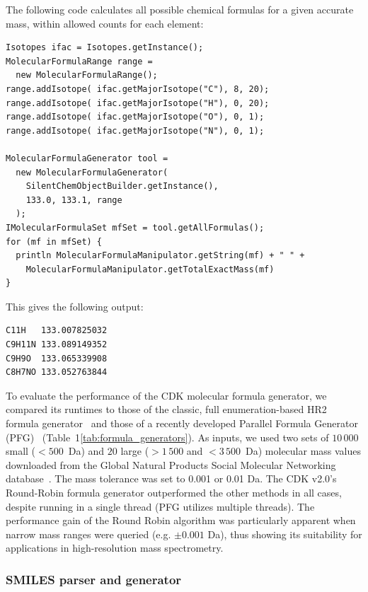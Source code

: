 \documentclass[10pt]{bmcart}
\def \cdkversion {v2.0}
\begin{document}
The following code calculates all possible chemical formulas for a given
accurate mass, within allowed counts for each element:

\vspace{0.2cm}
\begin{verbatim}
Isotopes ifac = Isotopes.getInstance();
MolecularFormulaRange range =
  new MolecularFormulaRange();
range.addIsotope( ifac.getMajorIsotope("C"), 8, 20);
range.addIsotope( ifac.getMajorIsotope("H"), 0, 20);
range.addIsotope( ifac.getMajorIsotope("O"), 0, 1);
range.addIsotope( ifac.getMajorIsotope("N"), 0, 1);

MolecularFormulaGenerator tool =
  new MolecularFormulaGenerator(
    SilentChemObjectBuilder.getInstance(),
    133.0, 133.1, range
  );
IMolecularFormulaSet mfSet = tool.getAllFormulas();
for (mf in mfSet) {
  println MolecularFormulaManipulator.getString(mf) + " " +
    MolecularFormulaManipulator.getTotalExactMass(mf)
}
\end{verbatim}
\vspace{0.2cm}

This gives the following output:

\vspace{0.2cm}
\begin{verbatim}
C11H   133.007825032
C9H11N 133.089149352
C9H9O  133.065339908
C8H7NO 133.052763844
\end{verbatim}
\vspace{0.2cm}

 To evaluate the performance of the CDK molecular formula generator, we
compared its runtimes to those of the classic, full enumeration-based HR2
formula generator~\cite{Kind2007} and those of a recently developed Parallel
Formula Generator (PFG)~\cite{Zhang2016} (Table~1\ref{tab:formula_generators}).
As inputs, we used two sets of $10\,000$ small ($< 500$~Da) and $20$ large ($>
1\,500$ and $< 3\,500$~Da) molecular mass values downloaded from the Global
Natural Products Social Molecular Networking database~\cite{wang2016}. The mass
tolerance was set to 0.001 or 0.01 Da. The CDK \cdkversion{}'s Round-Robin 
formula generator outperformed the other methods in all cases, despite running
in a single thread (PFG utilizes multiple threads). The performance gain of
the Round Robin algorithm was particularly apparent when narrow mass ranges 
were queried (e.g. $\pm 0.001$ Da), thus showing its suitability for
applications in high-resolution mass spectrometry.

\subsubsection*{SMILES parser and generator}
\end{document}
